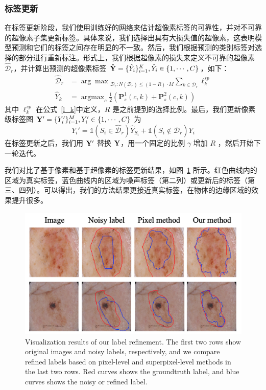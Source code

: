 \subsubsection{标签更新}

在标签更新阶段，我们使用训练好的网络来估计超像素标签的可靠性，并对不可靠的超像素子集更新标签。具体来说，我们选择出具有大损失值的超像素，这表明模型预测和它们的标签之间存在明显的不一致。然后，我们根据预测的类别标签对选择的部分进行重新标注。形式上，我们根据超像素的损失来定义不可靠的超像素 $\mathcal{\hat{D}}_r$，并计算出预测的超像素标签 $\mathbf{\hat{Y}} =\{\hat{Y}_i\}_{i=1}^K,\hat{Y}_i\in \{1,\cdots,C\}$，如下：
\begin{align}
    {\mathcal{\hat{D}}}_r &= {\arg\max}_{{\mathcal{D}_r}: N({\mathcal{D}_r})\le (1-{R})\cdot M} \sum_{k\in{\mathcal{D}_r}}\ell_k^{sp} \\
    \hat{Y}_k &= \mathop{\arg\max}_{c}\frac{1}{2}(\mathbf{P}_s^1(c,k) + \mathbf{P}_s^2(c,k))
\end{align}
其中 $\ell_k^{sp}$ 在公式~\ref{l_k}中定义，$R$ 是之前提到的选择比例。最后，我们更新像素级标签图 $\mathbf{Y}'=\{Y'_i\}_{i=1}^M, Y'_i\in\{1,\cdots, C\}$ 为
\begin{equation}
	Y_i' = \mathds{1}(S_i \in {\mathcal{\hat{D}}}_r )\hat{Y}_{S_i} + \mathds{1}(S_i \notin {\mathcal{\hat{D}}}_r )Y_i
\end{equation}
在标签更新之后，我们用 $\mathbf{Y}'$ 替换 $\mathbf{Y}$，用一个固定的比例 $\gamma$ 增加 $R$ ，然后开始下一轮迭代。

我们对比了基于像素和基于超像素的标签更新结果，如图~\ref{fig:vis_correct} 所示。红色曲线内的区域为真实标签，蓝色曲线内的区域为噪声标签（第二列）或更新后的标签（第三、四列）。可以得出，我们的方法结果更接近真实标签，在物体的边缘区域的效果提升很多。
    \begin{figure}[tbp]
        \centering 
        \includegraphics[width=1.0\textwidth]{img/c4/b_correct2.png}
        {Visualization results of our label refinement. The first two rows show original images and noisy labels, respectively, and we compare refined labels based on pixel-level and superpixel-level methods in the last two rows. Red curves shows the groundtruth label, and blue curves shows the noisy or refined label.}
        \label{fig:vis_correct}
    \end{figure}

